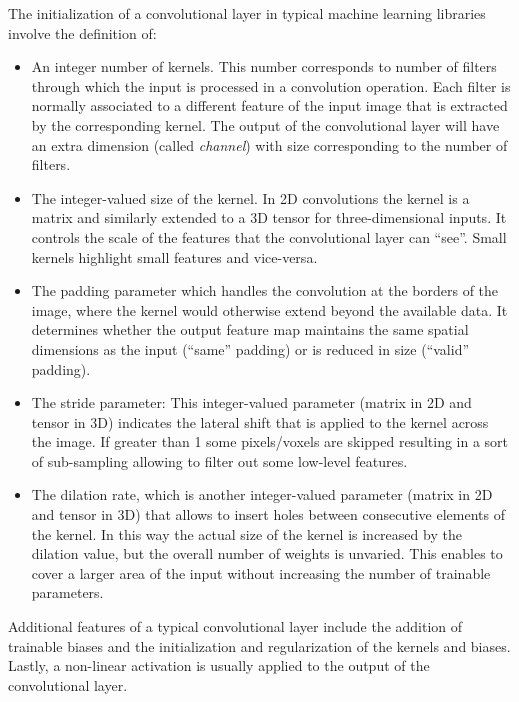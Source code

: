 The initialization of a convolutional layer in typical machine learning libraries involve the definition of: 
\begin{itemize}
    \item An integer number of kernels. This number corresponds to number of filters through which the input is 
    processed in a convolution operation. Each filter is normally associated to a different feature of the input 
    image that is extracted by the corresponding kernel. The output of the convolutional layer will 
    have an extra dimension (called \textit{channel}) with size corresponding to the number of filters.  

    \item The integer-valued size of the kernel. In 2D convolutions the kernel is a matrix and similarly 
    extended to a 3D tensor for three-dimensional inputs. It controls the scale of the features that the convolutional 
    layer can ``see''. Small kernels highlight small features and vice-versa.

    \item The padding parameter which handles the convolution at the borders of the image, where the kernel would 
    otherwise extend beyond the available data. It determines whether the output feature map maintains the same spatial 
    dimensions as the input (``same'' padding) or is reduced in size (``valid'' padding).

    \item The stride parameter: This integer-valued parameter (matrix in 2D and tensor in 3D) indicates the lateral shift 
    that is applied to the kernel across the image. If greater than 1 some pixels/voxels are skipped resulting in a 
    sort of sub-sampling allowing to filter out some low-level features. 
    
    \item The dilation rate, which is another integer-valued parameter (matrix in 2D and tensor in 3D) that allows 
    to insert holes between consecutive elements of the kernel. In this way the actual size of the kernel is increased 
    by the dilation value, but the overall number of weights is unvaried. This enables to cover a larger area of the input 
    without increasing the number of trainable parameters.

\end{itemize}

Additional features of a typical convolutional layer include the addition of trainable biases and the initialization and 
regularization of the kernels and biases. Lastly, a non-linear activation is usually applied to the output of 
the convolutional layer. 

